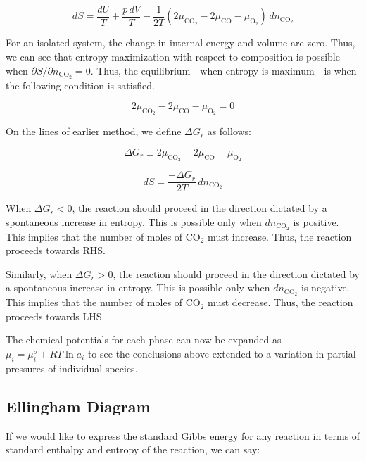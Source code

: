 \begin{equation} dS = \frac{dU}{T} + \frac{p \, dV}{T} - \frac{1}{2T} \left( 2 \mu_{\text{CO}_2} -  2\mu_\text{CO} - \mu_{\text{O}_2}  \right) \, dn_{\text{CO}_2} \end{equation}

For an isolated system, the change in internal energy and volume are zero. Thus, we can see that entropy maximization with respect to composition is possible when ${\partial S}/{\partial n_{\text{CO}_2}} = 0$. Thus, the equilibrium - when entropy is maximum - is when the following condition is satisfied.

\begin{equation} 2 \mu_{\text{CO}_2} -  2\mu_\text{CO} - \mu_{\text{O}_2} = 0 \end{equation}

On the lines of earlier method, we define $\Delta G_r$ as follows:

\begin{equation} \Delta G_r \equiv 2 \mu_{\text{CO}_2} -  2\mu_\text{CO} - \mu_{\text{O}_2} \end{equation}


\begin{equation} dS = \frac{-\Delta G_r}{2T} \, dn_{\text{CO}_2} \end{equation}

When $\Delta G_r < 0$, the reaction should proceed in the direction dictated by a spontaneous increase in entropy. This is possible only when $dn_{\text{CO}_2}$ is positive. This implies that the number of moles of $\text{CO}_2$ must increase. Thus, the reaction proceeds towards RHS.

Similarly, when $\Delta G_r > 0$, the reaction should proceed in the direction dictated by a spontaneous increase in entropy. This is possible only when $dn_{\text{CO}_2}$ is negative. This implies that the number of moles of $\text{CO}_2$ must decrease. Thus, the reaction proceeds towards LHS.

The chemical potentials for each phase can now be expanded as $ \mu_i = \mu^o_i + RT \ln a_i$ to see the conclusions above extended to a variation in partial pressures of individual species.

\subsection{Ellingham Diagram}

If we would like to express the standard Gibbs energy for any reaction in terms of standard enthalpy and entropy of the reaction, we can say:


